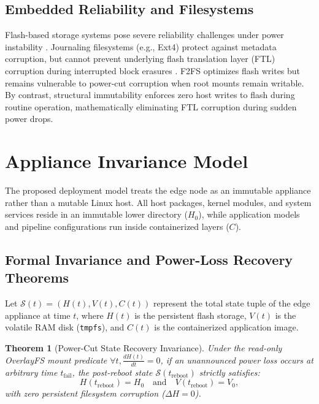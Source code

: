 \documentclass[conference]{IEEEtran}
\newtheorem{theorem}{Theorem}
\begin{document}
\subsection{Embedded Reliability and Filesystems}
Flash-based storage systems pose severe reliability challenges under power instability \cite{b12}. Journaling filesystems (e.g., Ext4) protect against metadata corruption, but cannot prevent underlying flash translation layer (FTL) corruption during interrupted block erasures \cite{b14}. F2FS \cite{b13} optimizes flash writes but remains vulnerable to power-cut corruption when root mounts remain writable. By contrast, structural immutability enforces zero host writes to flash during routine operation, mathematically eliminating FTL corruption during sudden power drops.

\section{Appliance Invariance Model}

The proposed deployment model treats the edge node as an immutable appliance rather than a mutable Linux host. All host packages, kernel modules, and system services reside in an immutable lower directory ($H_0$), while application models and pipeline configurations run inside containerized layers ($C$).

\subsection{Formal Invariance and Power-Loss Recovery Theorems}
Let $\mathcal{S}(t) = (H(t), V(t), C(t))$ represent the total state tuple of the edge appliance at time $t$, where $H(t)$ is the persistent flash storage, $V(t)$ is the volatile RAM disk (\texttt{tmpfs}), and $C(t)$ is the containerized application image.

\begin{theorem}[Power-Cut State Recovery Invariance]
Under the read-only OverlayFS mount predicate $\forall t, \frac{d H(t)}{dt} = 0$, if an unannounced power loss occurs at arbitrary time $t_{\mathrm{fail}}$, the post-reboot state $\mathcal{S}(t_{\mathrm{reboot}})$ strictly satisfies:
\begin{equation}
H(t_{\mathrm{reboot}}) = H_0 \quad \text{and} \quad V(t_{\mathrm{reboot}}) = V_0,
\label{eq:power_invariance}
\end{equation}
with zero persistent filesystem corruption ($\Delta H = 0$).
\end{theorem}
\end{document}
